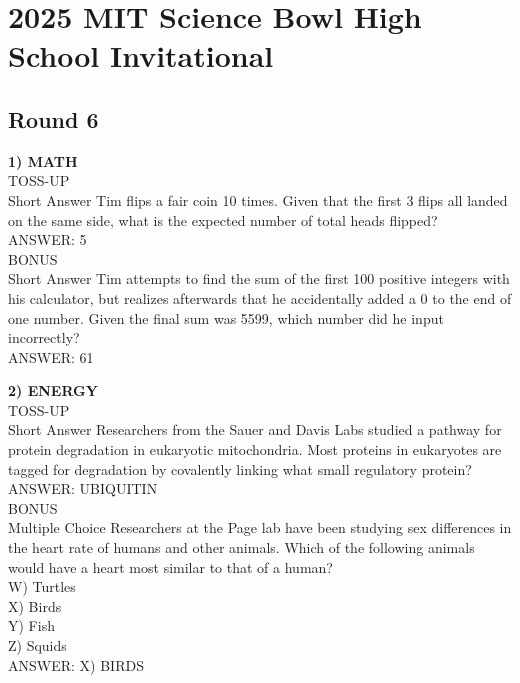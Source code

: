 \documentclass{article}
\begin{document}
\section*{2025 MIT Science Bowl High School Invitational}
\subsection*{Round 6}

\noindent \textbf{1) MATH} \\
TOSS-UP \\
Short Answer Tim flips a fair coin 10 times. Given that the first 3 flips all landed on the same side, what is the expected number of total heads flipped? \\
ANSWER: 5 \\
BONUS \\
Short Answer Tim attempts to find the sum of the first 100 positive integers with his calculator, but realizes afterwards that he accidentally added a 0 to the end of one number. Given the final sum was 5599, which number did he input incorrectly? \\
ANSWER: 61

\noindent \textbf{2) ENERGY} \\
TOSS-UP \\
Short Answer Researchers from the Sauer and Davis Labs studied a pathway for protein degradation in eukaryotic mitochondria. Most proteins in eukaryotes are tagged for degradation by covalently linking what small regulatory protein? \\
ANSWER: UBIQUITIN \\
BONUS \\
Multiple Choice Researchers at the Page lab have been studying sex differences in the heart rate of humans and other animals. Which of the following animals would have a heart most similar to that of a human? \\
W) Turtles \\
X) Birds \\
Y) Fish \\
Z) Squids \\
ANSWER: X) BIRDS
\end{document}

